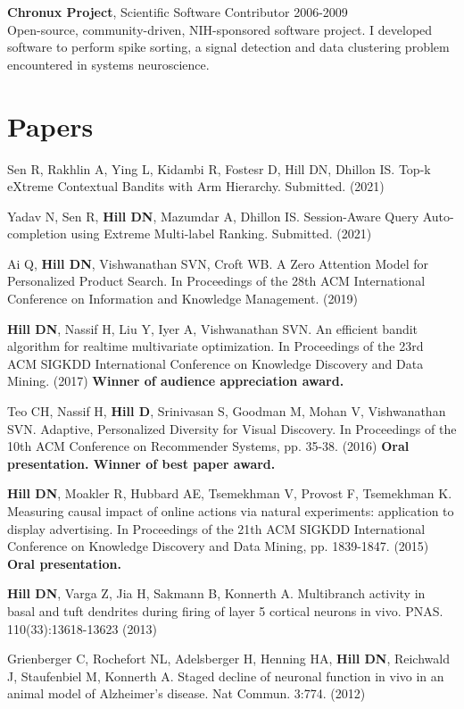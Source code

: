 \documentclass[line,11pt]{res}
\begin{document}
\begin{resume}
    	\textbf{Chronux Project}, Scientific Software Contributor 2006-2009 \\
    	Open-source, community-driven, NIH-sponsored software project. I developed software to perform spike sorting, a signal detection and data clustering problem encountered in systems neuroscience. 
    
\section{Papers}
\vspace{0.1in}
Sen R, Rakhlin A, Ying L, Kidambi R, Fostesr D, Hill DN, Dhillon IS. Top-k eXtreme Contextual Bandits with Arm Hierarchy. Submitted. (2021)

Yadav N, Sen R, \textbf{Hill DN}, Mazumdar A, Dhillon IS. Session-Aware Query Auto-completion using Extreme Multi-label Ranking. Submitted. (2021)

Ai Q, \textbf{Hill DN}, Vishwanathan SVN, Croft WB. A Zero Attention Model for Personalized Product Search. In Proceedings of the 28th ACM International Conference on Information and Knowledge Management. (2019)

\textbf{Hill DN}, Nassif H, Liu Y, Iyer A, Vishwanathan SVN. An efficient bandit algorithm for realtime multivariate optimization. In Proceedings of the 23rd ACM SIGKDD International Conference on Knowledge Discovery and Data Mining. (2017) \textbf{Winner of audience appreciation award.}

Teo CH, Nassif H, \textbf{Hill D}, Srinivasan S, Goodman M, Mohan V, Vishwanathan SVN. Adaptive, Personalized Diversity for Visual Discovery. In Proceedings of the 10th ACM Conference on Recommender Systems, pp. 35-38. (2016) \textbf{Oral presentation. Winner of best paper award.}

\textbf{Hill DN}, Moakler R, Hubbard AE, Tsemekhman V, Provost F, Tsemekhman K.  Measuring causal impact of online actions via natural experiments: application to display advertising. In Proceedings of the 21th ACM SIGKDD International Conference on Knowledge Discovery and Data Mining, pp. 1839-1847. (2015) \textbf{Oral presentation.}

\textbf{Hill DN}, Varga Z, Jia H, Sakmann B, Konnerth A. Multibranch activity in basal and tuft dendrites during firing of layer 5 cortical neurons in vivo. PNAS. 110(33):13618-13623 (2013)

Grienberger C, Rochefort NL, Adelsberger H, Henning HA, \textbf{Hill DN}, Reichwald J, Staufenbiel M, Konnerth A. Staged decline of neuronal function in vivo in an animal model of Alzheimer's disease. Nat Commun. 3:774. (2012) 


\end{resume}
\end{document}
